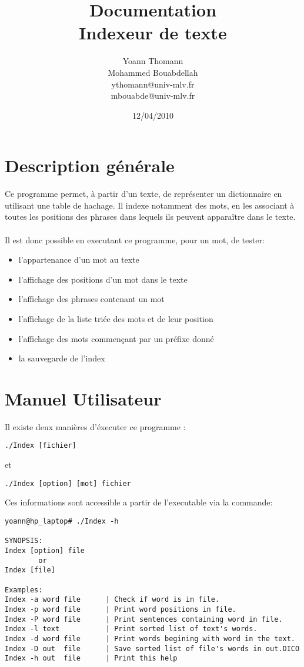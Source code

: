 \documentclass[french, 12pt, titlepage]{article}
\author{Yoann Thomann\\Mohammed Bouabdellah\\\scriptsize{ythomann@univ-mlv.fr\\mbouabde@univ-mlv.fr}}
\date{12/04/2010}
\title{\Huge Documentation\\Indexeur de texte}
\begin{document}
\vspace{\fill}
\maketitle
\newpage
\tableofcontents
\newpage
\section{Description générale}
Ce programme permet, à partir d'un texte, de représenter un
dictionnaire en utilisant une table de hachage. Il indexe notamment
des mots, en les associant à toutes les positions des phrases dans
lequels ils peuvent apparaître dans le texte. \\\\
Il est donc possible en executant ce programme, pour un mot, de
tester:
\begin{itemize}
\renewcommand{\labelitemi}{$\bullet$}
\item l'appartenance d'un mot au texte
\item l'affichage des positions d'un mot dans le texte
\item l'affichage des phrases contenant un mot
\item l'affichage de la liste triée des mots et de leur position
\item l'affichage des mots commençant par un préfixe donné
\item la sauvegarde de l'index
\end{itemize}

\section{Manuel Utilisateur}
Il existe deux manières d'éxecuter ce programme :
\begin{lstlisting}
./Index [fichier]
\end{lstlisting}
et
\begin{lstlisting}
./Index [option] [mot] fichier
\end{lstlisting}
Ces informations sont accessible a partir de l'executable via la
commande:
\begin{lstlisting}
yoann@hp_laptop# ./Index -h

SYNOPSIS:
Index [option] file
        or
Index [file]

Examples:
Index -a word file      | Check if word is in file.
Index -p word file      | Print word positions in file.
Index -P word file      | Print sentences containing word in file.
Index -l text           | Print sorted list of text's words.
Index -d word file      | Print words begining with word in the text.
Index -D out  file      | Save sorted list of file's words in out.DICO
Index -h out  file      | Print this help
\end{lstlisting}
\end{document}
